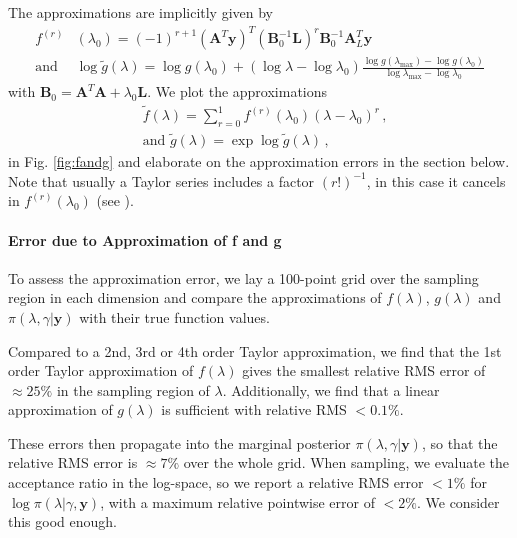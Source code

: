 The approximations are implicitly given by
\begin{align}
	f^{(r)}& (\lambda_0)= (-1)^{r+1} (\bm{A}^T \bm{y})^T (\bm{B}_0^{-1} \bm{L})^r \bm{B}_0^{-1} \bm{A}_L^T \bm{y} \label{eq:ftay}  \\
	\text{and } & \log{ \tilde{g}(\lambda)} = \log{ g(\lambda_{0})} + (\log{\lambda} - \log{\lambda_{0}})  \frac{ \log{g(\lambda_{\text{max}})} - \log{g(\lambda_{0})} }{\log{\lambda_{\text{max}}} - \log{\lambda_{0}} } 
	\label{eq:gtay}
\end{align} 
with $\bm{B}_0 = \bm{A}^T  \bm{A} + \lambda_0 \bm{L}$.
We plot the approximations
\begin{subequations}
	\label{eq:fandg}
	\begin{align}
		&\tilde{f} ( \lambda) = \sum^1_{r=0} 	f^{(r)}(\lambda_0) (\lambda-\lambda_0)^r  \label{eq:fAprox} \, ,  \\
		&\text{and } \tilde{g} (\lambda) = \exp \log{\tilde{g}(\lambda)}  \label{eq:gAprox} \, ,
	\end{align}
\end{subequations} in Fig. \ref{fig:fandg} and elaborate on the approximation errors in the section below.
Note that usually a Taylor series includes a factor $(r!)^{-1}$, in this case it cancels in $f^{(r)}(\lambda_0)$ (see \cite{fox2016fast}).

\paragraph{Error due to Approximation of f and g}
To assess the approximation error, we lay a 100-point grid over the sampling region in each dimension and compare the approximations of $f(\lambda)$, $g(\lambda)$ and $\pi(\lambda, \gamma | \bm{y})$ with their true function values.

Compared to a 2nd, 3rd or 4th order Taylor approximation, we find that the 1st order Taylor approximation of $f(\lambda)$ gives the smallest relative RMS error of $\approx 25 \%$ in the sampling region of $\lambda$.
Additionally, we find that a linear approximation of $g(\lambda)$ is sufficient with relative RMS $<0.1\%$.

These errors then propagate into the marginal posterior $\pi(\lambda , \gamma| \bm{y})$, so that the relative RMS error is $\approx 7 \%$ over the whole grid.
When sampling, we evaluate the acceptance ratio in the log-space, so we report a relative RMS error $< 1\%$ for $\log{\pi(\lambda| \gamma, \bm{y})}$, with a maximum relative pointwise error of $< 2\%$.
We consider this good enough.

